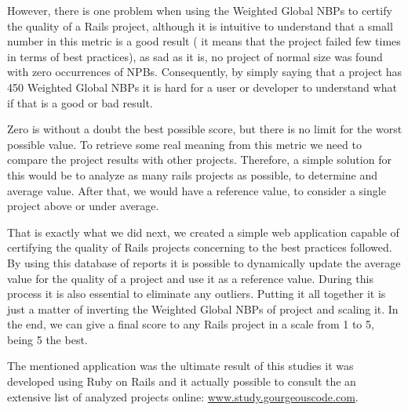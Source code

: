 However, there is one problem when using the Weighted Global NBPs to certify the quality of a Rails project, 
although it is intuitive to understand that a small number in this metric is a good result
( it means that the project failed few times in terms of best practices), as sad as it is, 
no project of normal size was found with zero occurrences of NPBs.
Consequently, by simply saying that a project has 450 Weighted Global NBPs it is hard for a user or developer
to understand what if that is a good or bad result.

Zero is without a doubt the best possible score, but there is no limit for the worst possible value.
To retrieve some real meaning from this metric we need to compare the project results with other projects.
Therefore, a simple solution for this would be to analyze as many rails projects as possible, to determine and average value.
After that, we would have a reference value, to consider a single project above or under average.

That is exactly what we did next, 
we created a simple web application capable of certifying the quality of Rails projects concerning to the best practices followed. 
By using this database of reports it is possible to dynamically update the average value for the quality of a project 
and use it as a reference value. During this process it is also essential to eliminate any outliers. 
Putting it all together it is just a matter of inverting the Weighted Global NBPs of project and scaling it. 
In the end, we can give a final score to any Rails project in a scale from 1 to 5, being 5 the best.

The mentioned application was the ultimate result of this studies it was developed using Ruby on Rails
and it actually possible to consult the an extensive list of analyzed projects online: \url{www.study.gourgeouscode.com}.










